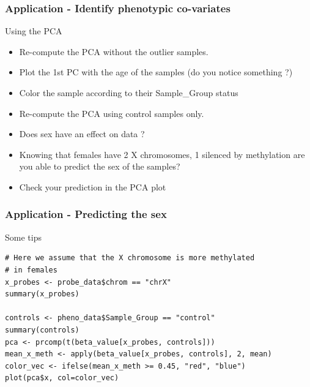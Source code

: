 \documentclass[10pt]{beamer}
\newenvironment{xframe}[2][]
  {\begin{frame}[fragile,environment=xframe,#1]
  \frametitle{#2}}
  {\end{frame}}
\begin{document}

\begin{xframe}{Application - Identify phenotypic co-variates}
  \begin{block}{Using the PCA}
    \begin{itemize}
      \item Re-compute the PCA without the outlier samples.
      \item Plot the 1st PC with the age of the samples (do you notice
      something ?)
      \item Color the sample according to their Sample\_Group status
      \item Re-compute the PCA using {\sf control} samples only.
	  \item Does sex have an effect on data ?
	  \item Knowing that females have 2 X chromosomes, 1 silenced by methylation
	  are you able to predict the sex of the samples?
	  \item Check your prediction in the PCA plot
    \end{itemize}
      \end{block}

\end{xframe}

\begin{xframe}[shrink=5]{Application - Predicting the sex}
  \begin{exampleblock}{Some tips}
\begin{verbatim}
# Here we assume that the X chromosome is more methylated
# in females
x_probes <- probe_data$chrom == "chrX"
summary(x_probes)

controls <- pheno_data$Sample_Group == "control"
summary(controls)
pca <- prcomp(t(beta_value[x_probes, controls]))
mean_x_meth <- apply(beta_value[x_probes, controls], 2, mean)
color_vec <- ifelse(mean_x_meth >= 0.45, "red", "blue")
plot(pca$x, col=color_vec)
\end{verbatim}  
  \end{exampleblock}
\end{xframe}

\end{document}
